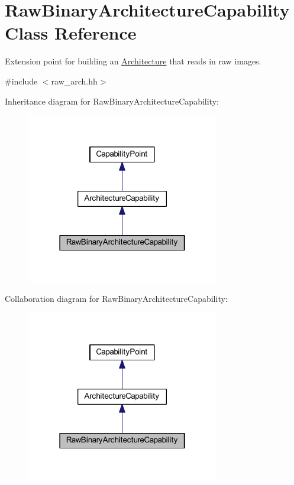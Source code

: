 \hypertarget{class_raw_binary_architecture_capability}{}\section{Raw\+Binary\+Architecture\+Capability Class Reference}
\label{class_raw_binary_architecture_capability}


Extension point for building an \mbox{\hyperlink{class_architecture}{Architecture}} that reads in raw images.  




{\ttfamily \#include $<$raw\+\_\+arch.\+hh$>$}



Inheritance diagram for Raw\+Binary\+Architecture\+Capability\+:
\nopagebreak
\begin{figure}[H]
\begin{center}
\leavevmode
\includegraphics[width=238pt]{class_raw_binary_architecture_capability__inherit__graph}
\end{center}
\end{figure}


Collaboration diagram for Raw\+Binary\+Architecture\+Capability\+:
\nopagebreak
\begin{figure}[H]
\begin{center}
\leavevmode
\includegraphics[width=238pt]{class_raw_binary_architecture_capability__coll__graph}
\end{center}
\end{figure}
